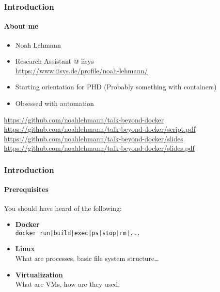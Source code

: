 \begin{frame}[c]
    \frametitle{Introduction}
    \framesubtitle{About me}
    \begin{itemize}
        \item Noah Lehmann
        \item Research Assistant @ iisys\\ \url{https://www.iisys.de/profile/noah-lehmann/}
        \item Starting orientation for PHD (Probably something with containers)
        \item Obsessed with automation
    \end{itemize}
    \vspace{1cm}
    \url{https://github.com/noahlehmann/talk-beyond-docker}
    \url{https://github.com/noahlehmann/talk-beyond-docker/script.pdf}
    \url{https://github.com/noahlehmann/talk-beyond-docker/slides}
    \url{https://github.com/noahlehmann/talk-beyond-docker/slides.pdf}
\end{frame}

\begin{frame}[c]
    \frametitle{Introduction}
    \framesubtitle{Prerequisites}
    You should have heard of the following:
    \vspace{0.5cm}
    \begin{itemize}
        \item \textbf{Docker}\\
        \texttt{docker run|build|exec|ps|stop|rm|...}
        \item \textbf{Linux}\\
        What are processes, basic file system structure\ldots
        \item \textbf{Virtualization}\\
        What are VMs, how are they used.
    \end{itemize}
\end{frame}